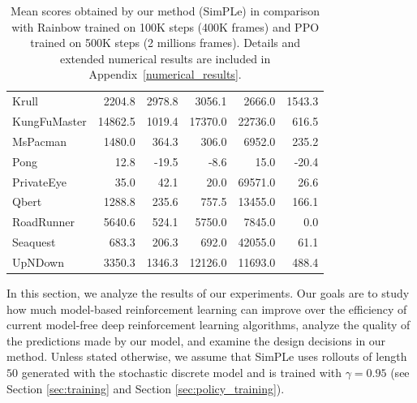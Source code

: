 \begin{table}
\begin{tabular}{l|r|r|r|r|r}
Krull          &   2204.8 &   2978.8 &   3056.1 &   2666.0 &  1543.3 \\
KungFuMaster   &  14862.5 &   1019.4 &  17370.0 &  22736.0 &   616.5 \\
MsPacman       &   1480.0 &    364.3 &    306.0 &   6952.0 &   235.2 \\
Pong           &     12.8 &    -19.5 &     -8.6 &     15.0 &   -20.4 \\
PrivateEye     &     35.0 &     42.1 &     20.0 &  69571.0 &    26.6 \\
Qbert          &   1288.8 &    235.6 &    757.5 &  13455.0 &   166.1 \\
RoadRunner     &   5640.6 &    524.1 &   5750.0 &   7845.0 &     0.0 \\
Seaquest       &    683.3 &    206.3 &    692.0 &  42055.0 &    61.1 \\
UpNDown        &   3350.3 &   1346.3 &  12126.0 &  11693.0 &   488.4 \\

\end{tabular}
\caption{Mean scores obtained by our method (SimPLe) in comparison with Rainbow trained on 100K steps (400K frames) and PPO trained on 500K steps (2 millions frames). Details and extended numerical results are included in Appendix~\ref{numerical_results}.}
\label{tab:shortNumericalResults}
\end{table}

In this section, we analyze the results of our experiments. Our goals are to study how much model-based reinforcement learning can improve over the efficiency of current model-free deep reinforcement learning algorithms, analyze the quality of the predictions made by our model, and examine the design decisions in our method. Unless stated otherwise, we assume that SimPLe uses rollouts of length $50$ generated with the stochastic discrete model and is trained with $\gamma=0.95$ (see Section \ref{sec:training} and Section \ref{sec:policy_training}). 

